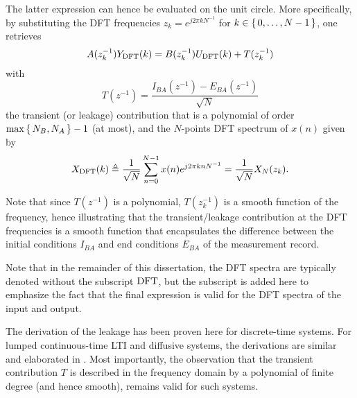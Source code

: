 The latter expression can hence be evaluated on the unit circle.
More specifically, by substituting the \gls{DFT} frequencies $z_k = e^{j2\pi k N^{-1}}$ for $k \in\set{0,\ldots,N-1}$, one retrieves
\begin{equation}
  A(z_k^{-1}) Y_{\operatorname{\mathrm{DFT}}}(k) = B(z_k^{-1}) U_{\operatorname{\mathrm{DFT}}}(k) + T(z_k^{-1})
\end{equation}
with 
\begin{equation}
T(z^{-1}) = \frac{I_{BA}(z^{-1}) - E_{BA}(z^{-1})}{\sqrt{N}}
\end{equation}
the transient (or leakage) contribution that is a polynomial of order $\max\set{\ensuremath{N_{B}}, \ensuremath{N_{A}}} -1$ (at most), and the $N$-points \gls{DFT} spectrum of $x(n)$ given by
\begin{equation}
  X_{\operatorname{\mathrm{DFT}}}(k) \triangleq \frac{1}{\sqrt{N}} \sum_{n=0}^{N-1} x(n) e^{j 2 \pi k n N^{-1}} = \frac{1}{\sqrt{N}} X_N(z_k)
  \text{.}
\end{equation}

Note that since $T(z^{-1})$ is a polynomial, $T(z_k^{-1})$ is a smooth function of the frequency, hence illustrating that the transient/leakage contribution at the \gls{DFT} frequencies is a smooth function that encapsulates the difference between the initial conditions $I_{BA}$ and end conditions $E_{BA}$ of the measurement record.

\begin{remark}
Note that in the remainder of this dissertation, the \gls{DFT} spectra are typically denoted without the subscript $\operatorname{\mathrm{DFT}}$, but the subscript is added here to emphasize the fact that the final expression is valid for the \gls{DFT} spectra of the input and output.
\end{remark}


\begin{remark}
The derivation of the leakage has been proven here for discrete-time systems.
For lumped continuous-time \gls{LTI} and diffusive systems, the derivations are similar and elaborated in \citet[Appendix 6.B]{Pintelon2012}.
Most importantly, the observation that the transient contribution $T$ is described in the frequency domain by a polynomial of finite degree (and hence smooth), remains valid for such systems.
\end{remark}

